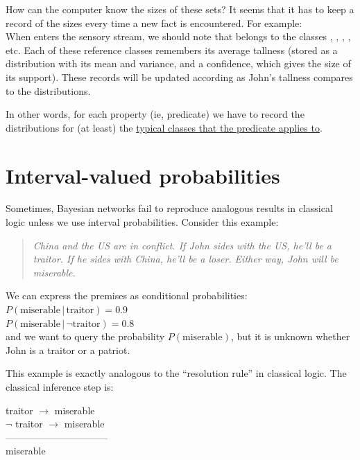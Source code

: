 How can the computer know the sizes of these sets?  It seems that it has to keep a record of the sizes every time a new fact is encountered.  For example:\\
When  enters the sensory stream, we should note that  belongs to the classes , , , , etc.  Each of these reference classes remembers its average tallness (stored as a distribution with its mean and variance, and a confidence, which gives the size of its support).  These records will be updated according as John's tallness compares to the distributions.

In other words, for each property (ie, predicate) we have to record the distributions for (at least) the \underline{typical classes that the predicate applies to}.

\section{Interval-valued probabilities}
\label{sec:intervalP}

Sometimes, Bayesian networks fail to reproduce analogous results in classical logic unless we use interval probabilities.  Consider this example:
\begin{quote}
\emph{China and the US are in conflict. If John sides with the US, he'll be a traitor. If he sides with China, he'll be a loser. Either way, John will be miserable.}
\end{quote}

We can express the premises as conditional probabilities:\\
\hspace*{1cm} $P(\mbox{miserable} \,|\, \mbox{traitor} ) = 0.9$ \\
\hspace*{1cm} $P(\mbox{miserable} \,|\, \neg\mbox{traitor} ) = 0.8$ \\
and we want to query the probability $P(\mbox{miserable})$, but it is unknown whether John is a traitor or a patriot.

This example is exactly analogous to the ``resolution rule'' in classical logic.  The classical inference step is:

\hspace*{1cm} traitor $\rightarrow$ miserable\\
\hspace*{1cm} $\neg$ traitor $\rightarrow$ miserable\\
\hspace*{1cm} --------------------------------\\
\hspace*{1cm} miserable

